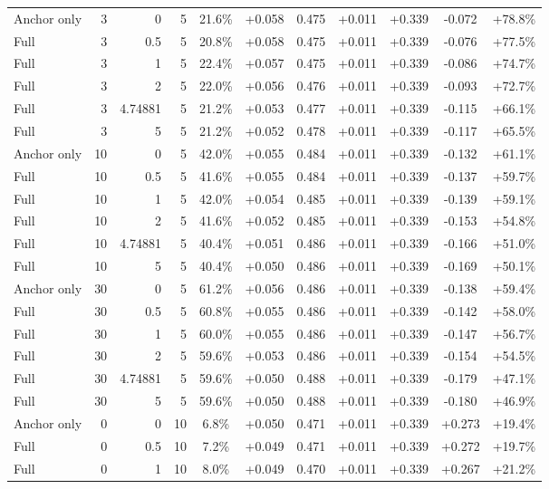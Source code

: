 \begin{table}[htbp]
\begin{tabular}{lrrrccccccc}
Anchor only & 3 & 0 & 5 & 21.6\% & +0.058 & 0.475 & +0.011 & +0.339 & -0.072 & +78.8\% \\
Full & 3 & 0.5 & 5 & 20.8\% & +0.058 & 0.475 & +0.011 & +0.339 & -0.076 & +77.5\% \\
Full & 3 & 1 & 5 & 22.4\% & +0.057 & 0.475 & +0.011 & +0.339 & -0.086 & +74.7\% \\
Full & 3 & 2 & 5 & 22.0\% & +0.056 & 0.476 & +0.011 & +0.339 & -0.093 & +72.7\% \\
Full & 3 & 4.74881 & 5 & 21.2\% & +0.053 & 0.477 & +0.011 & +0.339 & -0.115 & +66.1\% \\
Full & 3 & 5 & 5 & 21.2\% & +0.052 & 0.478 & +0.011 & +0.339 & -0.117 & +65.5\% \\
Anchor only & 10 & 0 & 5 & 42.0\% & +0.055 & 0.484 & +0.011 & +0.339 & -0.132 & +61.1\% \\
Full & 10 & 0.5 & 5 & 41.6\% & +0.055 & 0.484 & +0.011 & +0.339 & -0.137 & +59.7\% \\
Full & 10 & 1 & 5 & 42.0\% & +0.054 & 0.485 & +0.011 & +0.339 & -0.139 & +59.1\% \\
Full & 10 & 2 & 5 & 41.6\% & +0.052 & 0.485 & +0.011 & +0.339 & -0.153 & +54.8\% \\
Full & 10 & 4.74881 & 5 & 40.4\% & +0.051 & 0.486 & +0.011 & +0.339 & -0.166 & +51.0\% \\
Full & 10 & 5 & 5 & 40.4\% & +0.050 & 0.486 & +0.011 & +0.339 & -0.169 & +50.1\% \\
Anchor only & 30 & 0 & 5 & 61.2\% & +0.056 & 0.486 & +0.011 & +0.339 & -0.138 & +59.4\% \\
Full & 30 & 0.5 & 5 & 60.8\% & +0.055 & 0.486 & +0.011 & +0.339 & -0.142 & +58.0\% \\
Full & 30 & 1 & 5 & 60.0\% & +0.055 & 0.486 & +0.011 & +0.339 & -0.147 & +56.7\% \\
Full & 30 & 2 & 5 & 59.6\% & +0.053 & 0.486 & +0.011 & +0.339 & -0.154 & +54.5\% \\
Full & 30 & 4.74881 & 5 & 59.6\% & +0.050 & 0.488 & +0.011 & +0.339 & -0.179 & +47.1\% \\
Full & 30 & 5 & 5 & 59.6\% & +0.050 & 0.488 & +0.011 & +0.339 & -0.180 & +46.9\% \\
Anchor only & 0 & 0 & 10 & 6.8\% & +0.050 & 0.471 & +0.011 & +0.339 & +0.273 & +19.4\% \\
Full & 0 & 0.5 & 10 & 7.2\% & +0.049 & 0.471 & +0.011 & +0.339 & +0.272 & +19.7\% \\
Full & 0 & 1 & 10 & 8.0\% & +0.049 & 0.470 & +0.011 & +0.339 & +0.267 & +21.2\% \\

\end{tabular}
\end{table}
